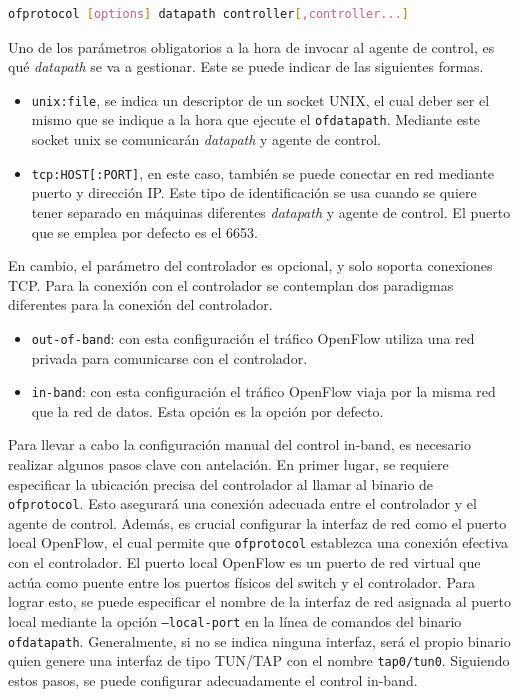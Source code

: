 \begin{lstlisting}[language= bash, style=Consola, caption={Interfaz CLI del binario ofprotocol},label=code:binofproto]
    ofprotocol [options] datapath controller[,controller...]
\end{lstlisting}
\vspace{0.5cm}

Uno de los parámetros obligatorios a la hora de invocar al agente de control, es qué \textit{datapath} se va a gestionar. Este se puede indicar de las siguientes formas.

\begin{itemize}
    \item \texttt{unix:file}, se indica un descriptor de un socket UNIX, el cual deber ser el mismo que se indique a la hora que ejecute el \texttt{ofdatapath}. Mediante este socket unix se comunicarán \textit{datapath} y agente de control.

    \item \texttt{tcp:HOST[:PORT]}, en este caso, también se puede conectar en red mediante puerto y dirección IP. Este tipo de identificación se usa cuando se quiere tener separado en máquinas diferentes \textit{datapath} y agente de control. El puerto que se emplea por defecto es el 6653.
\end{itemize}

En cambio, el parámetro del controlador es opcional, y solo soporta conexiones TCP. Para la conexión con el controlador se contemplan dos paradigmas diferentes para la conexión del controlador.

\begin{itemize}
    \item \texttt{out-of-band}: con esta configuración el tráfico OpenFlow utiliza una red privada para comunicarse con el controlador.

    \item \texttt{in-band}: con esta configuración el tráfico OpenFlow viaja por la misma red que la red de datos. Esta opción es la opción por defecto.
\end{itemize}

Para llevar a cabo la configuración manual del control in-band, es necesario realizar algunos pasos clave con antelación. En primer lugar, se requiere especificar la ubicación precisa del controlador al llamar al binario de \texttt{ofprotocol}. Esto asegurará una conexión adecuada entre el controlador y el agente de control. Además, es crucial configurar la interfaz de red como el puerto local OpenFlow, el cual permite que \texttt{ofprotocol} establezca una conexión efectiva con el controlador. El puerto local OpenFlow es un puerto de red virtual que actúa como puente entre los puertos físicos del switch y el controlador. Para lograr esto, se puede especificar el nombre de la interfaz de red asignada al puerto local mediante la opción \texttt{--local-port} en la línea de comandos del binario \texttt{ofdatapath}. Generalmente, si no se indica ninguna interfaz, será el propio binario quien genere una interfaz de tipo TUN/TAP con el nombre \texttt{tap0/tun0}. Siguiendo estos pasos, se puede configurar adecuadamente el control in-band.


